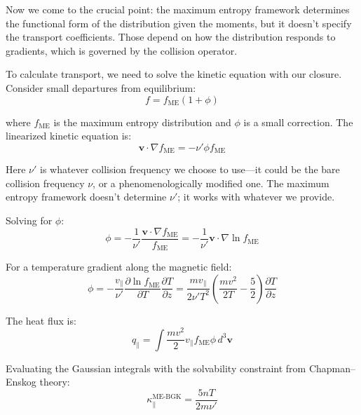 \documentclass[12pt,a4paper]{article}
\newcommand{\vect}[1]{\mathbf{#1}}
\begin{document}
Now we come to the crucial point: the maximum entropy framework determines the functional form of the distribution given the moments, but it doesn't specify the transport coefficients. Those depend on how the distribution responds to gradients, which is governed by the collision operator. 

To calculate transport, we need to solve the kinetic equation with our closure. Consider small departures from equilibrium:
\begin{equation}
f = f_{\text{ME}}(1 + \phi)
\label{eq:perturbation}
\end{equation}

where $f_{\text{ME}}$ is the maximum entropy distribution and $\phi$ is a small correction. The linearized kinetic equation is:
\begin{equation}
\vect{v} \cdot \nabla f_{\text{ME}} = -\nu' \phi f_{\text{ME}}
\label{eq:linearized_kinetic}
\end{equation}

Here $\nu'$ is whatever collision frequency we choose to use—it could be the bare collision frequency $\nu$, or a phenomenologically modified one. The maximum entropy framework doesn't determine $\nu'$; it works with whatever we provide.

Solving for $\phi$:
\begin{equation}
\phi = -\frac{1}{\nu'} \frac{\vect{v} \cdot \nabla f_{\text{ME}}}{f_{\text{ME}}} = -\frac{1}{\nu'} \vect{v} \cdot \nabla \ln f_{\text{ME}}
\label{eq:phi_solution}
\end{equation}

For a temperature gradient along the magnetic field:
\begin{equation}
\phi = -\frac{v_\parallel}{\nu'} \frac{\partial \ln f_{\text{ME}}}{\partial T} \frac{\partial T}{\partial z} = \frac{m v_\parallel}{2\nu' T^2} \left(\frac{m v^2}{2T} - \frac{5}{2}\right) \frac{\partial T}{\partial z}
\label{eq:phi_temperature}
\end{equation}

The heat flux is:
\begin{equation}
q_\parallel = \int \frac{m v^2}{2} v_\parallel f_{\text{ME}} \phi \, d^3\vect{v}
\label{eq:heat_flux_me}
\end{equation}

Evaluating the Gaussian integrals with the solvability constraint from Chapman--Enskog theory:
\begin{equation}
\boxed{\kappa_{\parallel}^{\text{ME-BGK}} = \frac{5nT}{2m\nu'}}
\label{eq:thermal_conductivity_me}
\end{equation}
\end{document}
